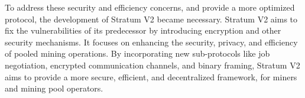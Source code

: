 \medskip

To address these security and efficiency concerns, and provide a more optimized protocol, the development of Stratum V2 became necessary. Stratum V2 aims to fix the vulnerabilities of its predecessor by introducing encryption and other security mechanisms. It focuses on enhancing the security, privacy, and efficiency of pooled mining operations.
By incorporating new sub-protocols like job negotiation,  encrypted communication channels, and binary framing, Stratum V2 aims to provide a more secure, efficient, and decentralized framework, for miners and mining pool operators. 
